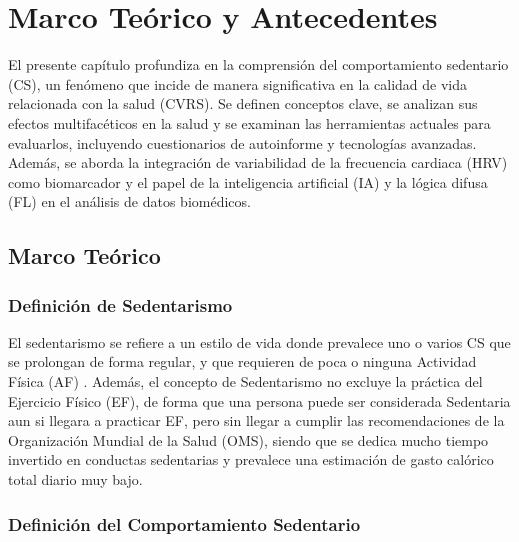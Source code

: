 ﻿\chapter{Marco Teórico y Antecedentes}
\label{chap:marco_teorico}

El presente capítulo profundiza en la comprensión del comportamiento sedentario (CS), un fenómeno que incide de manera significativa en la calidad de vida relacionada con la salud (CVRS). Se definen conceptos clave, se analizan sus efectos multifacéticos en la salud y se examinan las herramientas actuales para evaluarlos, incluyendo cuestionarios de autoinforme y tecnologías avanzadas. Además, se aborda la integración de variabilidad de la frecuencia cardiaca (HRV) como biomarcador y el papel de la inteligencia artificial (IA) y la lógica difusa (FL) en el análisis de datos biomédicos.

\section{Marco Teórico}
\label{sec:marco_teorico}

\subsection{Definición de Sedentarismo}
\label{subsec:definicion_sedentarismo}

El sedentarismo se refiere a un estilo de vida donde prevalece uno o varios CS que se prolongan de forma regular, y que requieren de poca o ninguna Actividad Física (AF) \citep{Tremblay2010Physiological}. Además, el concepto de Sedentarismo no excluye la práctica del Ejercicio Físico (EF), de forma que una persona puede ser considerada Sedentaria aun si llegara a practicar EF, pero sin llegar a cumplir las recomendaciones de la Organización Mundial de la Salud (OMS), siendo que se dedica mucho tiempo invertido en conductas sedentarias y prevalece una estimación de gasto calórico total diario muy bajo.

\subsection{Definición del Comportamiento Sedentario}
\label{subsec:definicion_cs}

